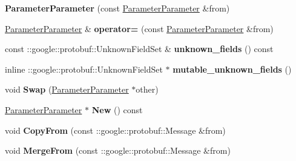 \begin{DoxyCompactItemize}
{\bfseries Parameter\+Parameter} (const \mbox{\hyperlink{classcaffe_1_1_parameter_parameter}{Parameter\+Parameter}} \&from)
\item 
\mbox{\label{classcaffe_1_1_parameter_parameter_aca5dff5d4af60894e60df1ffce0add56}} 
\mbox{\hyperlink{classcaffe_1_1_parameter_parameter}{Parameter\+Parameter}} \& {\bfseries operator=} (const \mbox{\hyperlink{classcaffe_1_1_parameter_parameter}{Parameter\+Parameter}} \&from)
\item 
\mbox{\label{classcaffe_1_1_parameter_parameter_a55ebbb2503aefae1ce20947f6de77da5}} 
const \+::google\+::protobuf\+::\+Unknown\+Field\+Set \& {\bfseries unknown\+\_\+fields} () const
\item 
\mbox{\label{classcaffe_1_1_parameter_parameter_ad16d5339deeac55dfb8941bf98ca9999}} 
inline \+::google\+::protobuf\+::\+Unknown\+Field\+Set $\ast$ {\bfseries mutable\+\_\+unknown\+\_\+fields} ()
\item 
\mbox{\label{classcaffe_1_1_parameter_parameter_a5e9faa2bc95df3a7a3b37aeb7045cda0}} 
void {\bfseries Swap} (\mbox{\hyperlink{classcaffe_1_1_parameter_parameter}{Parameter\+Parameter}} $\ast$other)
\item 
\mbox{\label{classcaffe_1_1_parameter_parameter_a61a797b2b9e476b8a7acf23084aeda6a}} 
\mbox{\hyperlink{classcaffe_1_1_parameter_parameter}{Parameter\+Parameter}} $\ast$ {\bfseries New} () const
\item 
\mbox{\label{classcaffe_1_1_parameter_parameter_a9571a1afee9af22d8095143c34bd7714}} 
void {\bfseries Copy\+From} (const \+::google\+::protobuf\+::\+Message \&from)
\item 
\mbox{\label{classcaffe_1_1_parameter_parameter_a87d5be88ca3e2b7504ea52a19ca0a378}} 
void {\bfseries Merge\+From} (const \+::google\+::protobuf\+::\+Message \&from)
\item 
\mbox{\label{classcaffe_1_1_parameter_parameter_a7c0b0dca9f611516296d6fa8c06022a3}} 

\end{DoxyCompactItemize}
